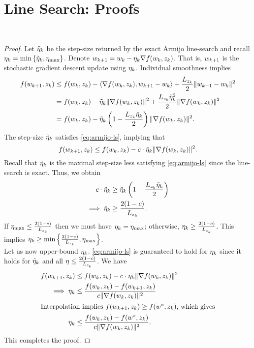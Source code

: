 
\section{Line Search: Proofs}~\label{app:line-search}

\stepSizeBound*
\begin{proof}
    Let \( {\tilde{\eta}}_{k} \) be the step-size returned by the exact Armijo line-search and recall \( \eta_k = \min\left\{{\tilde{\eta}}_{k}, \eta_{\text{max}}\right\} \).
    Denote \( w_{k+1} = w_k - \eta_k \nabla f(w_k,z_{k}) \).
    That is, \( w_{k+1} \) is the stochastic gradient descent update using \( \eta_k \).
    Individual smoothness implies
    \begin{align*}
        f(w_{k+1}, z_{k}) &\leq f(w_k, z_{k}) - \left\langle\nabla f(w_k, z_{k}), w_{k+1} - w_k\right\rangle + \frac{L_{z_{k}}}{2}\|w_{k+1} - w_k\|^2\\
                     &= f(w_k, z_{k}) - {\tilde{\eta}}_{k} \|\nabla f(w_k, z_{k})\|^2 + \frac{L_{z_{k}} {\tilde{\eta}}_{k}^2}{2}\|\nabla f(w_k, z_{k})\|^2\\
                     &= f(w_k, z_{k}) - {\tilde{\eta}}_{k} \left(1 - \frac{L_{z_{k}} {\tilde{\eta}}_{k}}{2}\right)\|\nabla f(w_k, z_{k})\|^2.
    \end{align*}
    The step-size \( {\tilde{\eta}}_{k} \) satisfies \autoref{eq:armijo-ls}, implying that
    \[ f(w_{k+1}, z_{k}) \leq f(w_k, z_{k}) - c \cdot {\tilde{\eta}}_{k} \|\nabla f(w_k, z_{k})\|^2. \]
    Recall that \( {\tilde{\eta}}_{k} \) is the maximal step-size less satisfying \autoref{eq:armijo-ls} since the line-search is exact.
    Thus, we obtain
    \begin{align*}
        c \cdot {\tilde{\eta}}_{k} &\geq {\tilde{\eta}}_{k} \left(1 - \frac{L_{z_{k}} {\tilde{\eta}}_{k}}{2}\right)\\
        \implies {\tilde{\eta}}_{k} &\geq \frac{2(1-c)}{L_{z_{k}}}.
    \end{align*}
    If \( \eta_{\text{max}} \leq \frac{2(1-c)}{L_{z_{k}}} \) then we must have \( \eta_k = \eta_{\text{max}} \); otherwise, \( \eta_k \geq \frac{2(1-c)}{L_{z_{k}}} \).
    This implies \( \eta_k \geq \min\left\{ \frac{2(1-c)}{L_{z_{k}}}, \eta_{\text{max}}\right\}\).\\

    Let us now upper-bound \( \eta_k \). 
    \autoref{eq:armijo-ls} is guaranteed to hold for \( \eta_k \) since it holds for \( {\tilde{\eta}}_{k} \) and all \( \eta \leq \frac{2(1-c)}{L_{z_{k}}} \). 
    We have 
    \begin{align*}
        f(w_{k+1}, z_{k}) &\leq f(w_k, z_{k}) - c \cdot \eta_k \|\nabla f(w_k, z_{k})\|^2\\
        \implies \eta_k &\leq \frac{f(w_k, z_{k}) - f(w_{k+1}, z_{k})}{c \|\nabla f(w_k, z_{k})\|^2}\\
        \intertext{Interpolation implies \( f(w_{k+1}, z_{k}) \geq f(w^*, z_{k}) \), which gives}
        \eta_k &\leq \frac{f(w_k, z_{k}) - f(w^*, z_{k})}{c \|\nabla f(w_k, z_{k})\|^2}.
    \end{align*}
    This completes the proof.
\end{proof}

